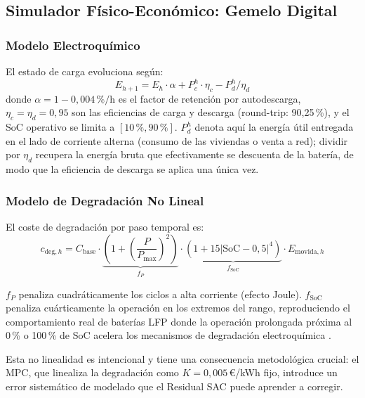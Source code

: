 \documentclass[12pt, a4paper, twoside]{report}
\begin{document}
\subsection{Simulador Físico-Económico: Gemelo Digital}
\label{sub:simulador}

\subsubsection{Modelo Electroquímico}

El estado de carga evoluciona según:
\begin{equation}
  E_{h+1} = E_h \cdot \alpha + P_c^h \cdot \eta_c - P_d^h / \eta_d
  \label{eq:balance}
\end{equation}
donde $\alpha = 1 - 0{,}004\,\%/\text{h}$ es el factor de retención por
autodescarga, $\eta_c = \eta_d = 0{,}95$ son las eficiencias de carga y
descarga (round-trip: 90{,}25\,\%), y el SoC operativo se limita a
$[10\,\%, 90\,\%]$. $P_d^h$ denota aquí la energía útil entregada en el lado de
corriente alterna (consumo de las viviendas o venta a red); dividir por
$\eta_d$ recupera la energía bruta que efectivamente se descuenta de la
batería, de modo que la eficiencia de descarga se aplica una única vez.

\subsubsection{Modelo de Degradación No Lineal}

El coste de degradación por paso temporal es:
\begin{equation}
  c_{\text{deg},h} = C_{\text{base}} \cdot
  \underbrace{\left(1 + \left(\frac{P}{P_{\max}}\right)^2\right)}_{f_P} \cdot
  \underbrace{\left(1 + 15\left|\text{SoC}-0{,}5\right|^4\right)}_{f_{\text{SoC}}} \cdot
  E_{\text{movida},h}
  \label{eq:degradacion}
\end{equation}

$f_P$ penaliza cuadráticamente los ciclos a alta corriente (efecto Joule).
$f_{\text{SoC}}$ penaliza cuárticamente la operación en los extremos del rango,
reproduciendo el comportamiento real de baterías LFP donde la operación
prolongada próxima al 0\,\% o 100\,\% de SoC acelera los mecanismos de
degradación electroquímica \citep{Xu2016}.

Esta no linealidad es intencional y tiene una consecuencia metodológica crucial:
el MPC, que linealiza la degradación como $K = 0{,}005$\,€/kWh fijo, introduce
un error sistemático de modelado que el Residual SAC puede aprender a corregir.
\end{document}
